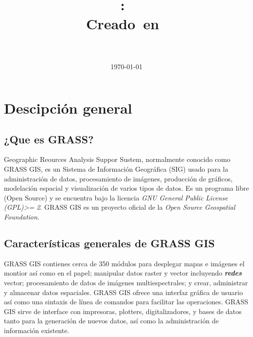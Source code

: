 \documentclass{article}
\title{
\vspace{2in}
\textmd{\textbf{\Curso:\ \Titulo}}\\
\normalsize\vspace{0.1in}\small{Creado\ en\ \Fecha}\\
\vspace{0.1in}\large{\textit{\Autor\ \\ \Profesion}}
\vspace{3in}
}
\author{\textbf{\SIGLA}}
\date{\today} %
\begin{document}
\maketitle
\newpage
\tableofcontents
\newpage
\section{Descipción general}
\subsection{¿Que es GRASS?}
Geographic Reources Analysis Suppor Sustem, normalmente conocido como GRASS GIS, es un Sistema de Información Geográfica (SIG) usado para la administración de datos, procesamiento de imágenes, producción de gráficos, modelación espacial y visualización de varios tipos de datos. Es un programa libre (Open Source) y se encuentra bajo la licencia \textit{GNU General Public License (GPL)>=  2}. GRASS GIS es un proyecto oficial de la \textit{Open Source Geospatial Foundation}.

\subsection{Características generales de GRASS GIS}
GRASS GIS contienes cerca de 350 módulos para desplegar mapas e imágenes el montior así como en el papel; manipular datos raster y vector incluyendo \textbf{\textit{redes}} vector; procesamiento de datos de im\'agenes multiespectrales; y crear, administrar y almacenar datos espaciales. GRASS GIS ofrece una interfaz gráfica de usuario así como una sintaxis de línea de comandos para facilitar las operaciones. GRASS GIS sirve de interface con impresoras, plotters, digitalizadores, y bases de datos tanto para la generación de nuevos datos, así como la administración de información existente.

\end{document}
